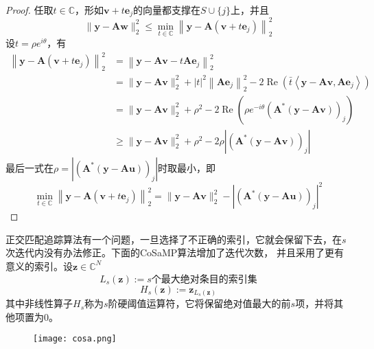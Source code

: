 \begin{proof}
任取$t \in \mathbb{C}$，形如$\mathbf{v}+t \mathbf{e}_j$的向量都支撑在$S \cup\{j\}$上，并且
\begin{equation}
    \|\mathbf{y}-\mathbf{A} \mathbf{w}\|_2^2 \leq \min _{t \in \mathbb{C}}\left\|\mathbf{y}-\mathbf{A}\left(\mathbf{v}+t \mathbf{e}_j\right)\right\|_2^2
\end{equation}
设$t=\rho e^{i \theta}$，有
\begin{equation}
    \begin{aligned}
    \left\|\mathbf{y}-\mathbf{A}\left(\mathbf{v}+t \mathbf{e}_j\right)\right\|_2^2 & =\left\|\mathbf{y}-\mathbf{A v}-t \mathbf{A} \mathbf{e}_j\right\|_2^2 \\
    & =\|\mathbf{y}-\mathbf{A v}\|_2^2+|t|^2\left\|\mathbf{A} \mathbf{e}_j\right\|_2^2-2 \operatorname{Re}\left(\bar{t}\left\langle\mathbf{y}-\mathbf{A v},\mathbf{A} \mathbf{e}_j\right\rangle\right) \\
    & =\|\mathbf{y}-\mathbf{A v}\|_2^2+\rho^2-2 \operatorname{Re}\left(\rho e^{-i \theta}\left(\mathbf{A}^*(\mathbf{y}-\mathbf{A v})\right)_j\right) \\
    & \geq\|\mathbf{y}-\mathbf{A v}\|_2^2+\rho^2-2 \rho\left|\left(\mathbf{A}^*(\mathbf{y}-\mathbf{A} \mathbf{v})\right)_j\right|
    \end{aligned}
\end{equation}
最后一式在$\rho=\left|\left(\mathbf{A}^*(\mathbf{y}-\mathbf{A} \mathbf{u})\right)_j\right|$时取最小，即
\begin{equation}
    \min _{t \in \mathbb{C}}\left\|\mathbf{y}-\mathbf{A}\left(\mathbf{v}+t \mathbf{e}_j\right)\right\|_2^2=\|\mathbf{y}-\mathbf{A v}\|_2^2-\left|\left(\mathbf{A}^*(\mathbf{y}-\mathbf{A} \mathbf{u})\right)_j\right|^2
\end{equation}
\end{proof}
正交匹配追踪算法有一个问题，一旦选择了不正确的索引，它就会保留下去，在$s$次迭代内没有办法修正。下面的CoSaMP算法增加了迭代次数，
并且采用了更有意义的索引。设$\mathbf{z} \in \mathbb{C}^N$
\begin{equation}
    L_s(\mathbf{z}):=s\text{个最大绝对条目的索引集}
\end{equation}
\begin{equation}
    H_s(\mathbf{z}):=\mathbf{z}_{L_s(\mathbf{z})}
\end{equation}
其中非线性算子$H_s$称为$s$阶硬阈值运算符，它将保留绝对值最大的前$s$项，并将其他项置为0。\par
\begin{figure}[!htbp]
    \centering
    \texttt{[image: cosa.png]}
\end{figure}

